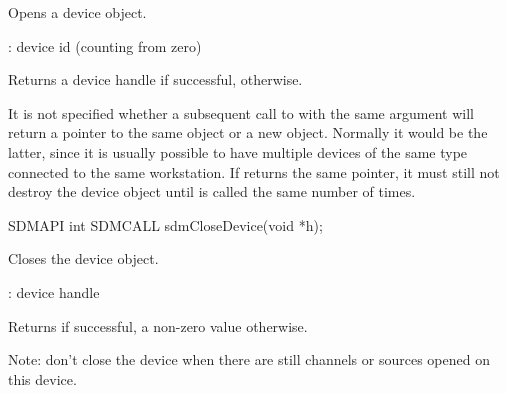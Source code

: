 \documentclass[a4paper,12pt,twoside,extrafontsizes]{memoir}
\begin{document}
\begin{funcdescr}
	Opens a device object.
\end{funcdescr}

\begin{funcparams}
	: device id (counting from zero)
\end{funcparams}

\begin{funcret}
	Returns a device handle if successful,  otherwise.
\end{funcret}

\begin{funcremarks}
	It is not specified whether a subsequent call to  with the same  argument will return a pointer to the same object or a new object. Normally it would be the latter, since it is usually possible to have multiple devices of the same type connected to the same workstation. If  returns the same pointer, it must still not destroy the device object until  is called the same number of times.
\end{funcremarks}



\begin{cfuncprototype}
SDMAPI int SDMCALL sdmCloseDevice(void *h);
\end{cfuncprototype}

\begin{funcdescr}
	Closes the device object.
\end{funcdescr}

\begin{funcparams}
	: device handle
\end{funcparams}

\begin{funcret}
	Returns  if successful, a non-zero value otherwise.
\end{funcret}

\begin{funcremarks}
	Note: don't close the device when there are still channels or sources opened on this device.
\end{funcremarks}


\end{document}
